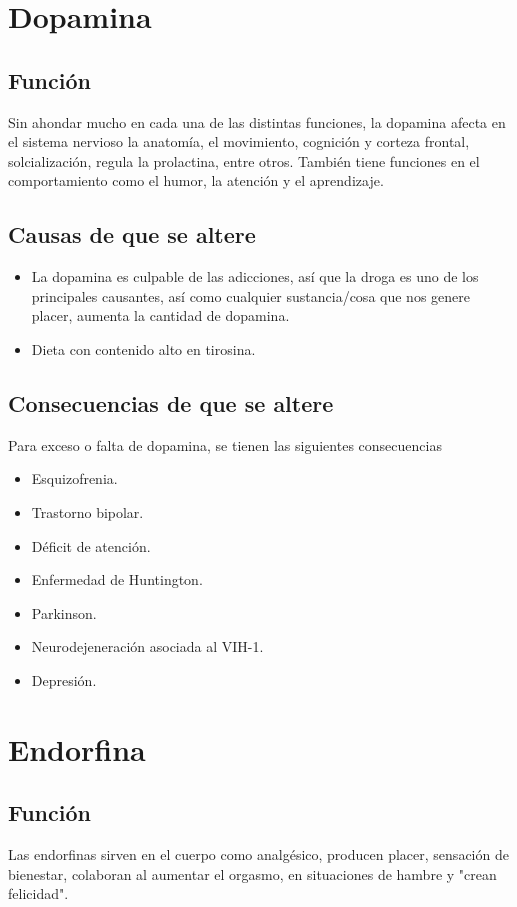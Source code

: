 \begin{multicols}{2}
\section*{Dopamina}
\subsection*{Función}
Sin ahondar mucho en cada una de las distintas funciones, la dopamina afecta en el sistema nervioso la anatomía, el movimiento, cognición y corteza frontal, solcialización, regula la prolactina, entre otros. También tiene funciones en el comportamiento como el humor, la atención y el aprendizaje.
\subsection*{Causas de que se altere}
\begin{itemize}
	\item La dopamina es culpable de las adicciones, así que la droga es uno de los principales causantes, así como cualquier sustancia/cosa que nos genere placer, aumenta la cantidad de dopamina.
	\item Dieta con contenido alto en tirosina.
\end{itemize}
\subsection*{Consecuencias de que se altere}
Para exceso o falta de dopamina, se tienen las siguientes consecuencias
\begin{itemize}
	\item Esquizofrenia.
	\item Trastorno bipolar. 
	\item Déficit de atención.
	\item Enfermedad de Huntington.
	\item Parkinson.
	\item Neurodejeneración asociada al VIH-1.
	\item Depresión.
\end{itemize}




\section*{Endorfina}
\subsection*{Función}
Las endorfinas sirven en el cuerpo como analgésico, producen placer, sensación de bienestar, colaboran al aumentar el orgasmo, en situaciones de hambre y "crean felicidad".

\end{multicols}
